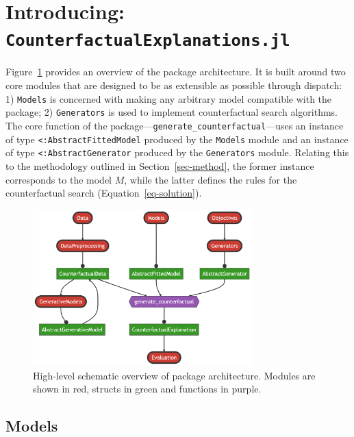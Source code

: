 \documentclass[
  letterpaper,
  DIV=11,
  numbers=noendperiod]{scrartcl}
\begin{document}
\hypertarget{sec-arch}{%
\section{\texorpdfstring{Introducing:
\texttt{CounterfactualExplanations.jl}}{Introducing: CounterfactualExplanations.jl}}\label{sec-arch}}

Figure~\ref{fig-arch} provides an overview of the package architecture.
It is built around two core modules that are designed to be as
extensible as possible through dispatch: 1) \texttt{Models} is concerned
with making any arbitrary model compatible with the package; 2)
\texttt{Generators} is used to implement counterfactual search
algorithms. The core function of the
package---\texttt{generate\_counterfactual}---uses an instance of type
\texttt{\textless{}:AbstractFittedModel} produced by the \texttt{Models}
module and an instance of type \texttt{\textless{}:AbstractGenerator}
produced by the \texttt{Generators} module. Relating this to the
methodology outlined in Section~\ref{sec-method}, the former instance
corresponds to the model \(M\), while the latter defines the rules for
the counterfactual search (Equation~\ref{eq-solution}).

\begin{figure}

{\centering \includegraphics[width=3.33333in,height=2.38095in]{www/pkg_architecture.png}

}

\caption{\label{fig-arch}High-level schematic overview of package
architecture. Modules are shown in red, structs in green and functions
in purple.}

\end{figure}

\hypertarget{models}{%
\subsection{Models}\label{models}}
\end{document}
